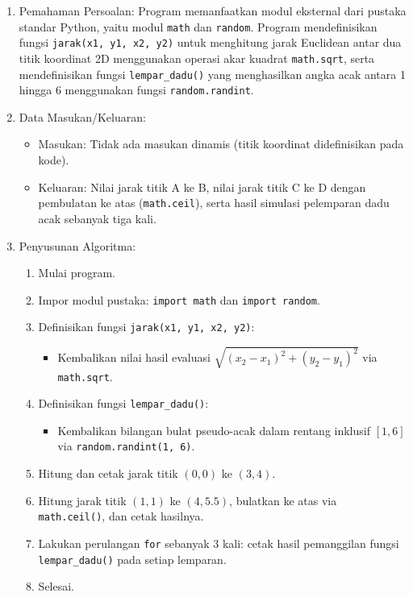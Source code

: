 \documentclass[12pt,a4paper]{article}
\begin{document}
\begin{enumerate}
    \item Pemahaman Persoalan: Program memanfaatkan modul eksternal dari pustaka standar Python, yaitu modul \texttt{math} dan \texttt{random}. Program mendefinisikan fungsi \texttt{jarak(x1, y1, x2, y2)} untuk menghitung jarak Euclidean antar dua titik koordinat 2D menggunakan operasi akar kuadrat \texttt{math.sqrt}, serta mendefinisikan fungsi \texttt{lempar\_dadu()} yang menghasilkan angka acak antara 1 hingga 6 menggunakan fungsi \texttt{random.randint}.
    \item Data Masukan/Keluaran:
    \begin{itemize}
        \item Masukan: Tidak ada masukan dinamis (titik koordinat didefinisikan pada kode).
        \item Keluaran: Nilai jarak titik A ke B, nilai jarak titik C ke D dengan pembulatan ke atas (\texttt{math.ceil}), serta hasil simulasi pelemparan dadu acak sebanyak tiga kali.
    \end{itemize}
    \item Penyusunan Algoritma:
    \begin{enumerate}[label=\alph*.]
        \item Mulai program.
        \item Impor modul pustaka: \texttt{import math} dan \texttt{import random}.
        \item Definisikan fungsi \texttt{jarak(x1, y1, x2, y2)}:
        \begin{itemize}
            \item Kembalikan nilai hasil evaluasi $\sqrt{(x_2 - x_1)^2 + (y_2 - y_1)^2}$ via \texttt{math.sqrt}.
        \end{itemize}
        \item Definisikan fungsi \texttt{lempar\_dadu()}:
        \begin{itemize}
            \item Kembalikan bilangan bulat pseudo-acak dalam rentang inklusif $[1, 6]$ via \texttt{random.randint(1, 6)}.
        \end{itemize}
        \item Hitung dan cetak jarak titik $(0,0)$ ke $(3,4)$.
        \item Hitung jarak titik $(1,1)$ ke $(4, 5.5)$, bulatkan ke atas via \texttt{math.ceil()}, dan cetak hasilnya.
        \item Lakukan perulangan \texttt{for} sebanyak 3 kali: cetak hasil pemanggilan fungsi \texttt{lempar\_dadu()} pada setiap lemparan.
        \item Selesai.
    \end{enumerate}
\end{enumerate}
\end{document}
